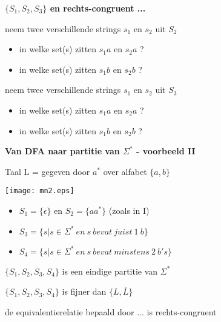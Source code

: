 \documentclass{seminar}
\newcommand{\openpagina}{}
\begin{document}
\begin{slide}
{\bf $\{S_1,S_2,S_3\}$ en rechts-congruent ...}

neem twee verschillende strings $s_1$ en $s_2$ uit $S_2$
\begin{itemize}
\item in welke set(s) zitten $s_1a$ en $s_2a$ ?
\item in welke set(s) zitten $s_1b$ en $s_2b$ ?
\end{itemize}

neem twee verschillende strings $s_1$ en $s_2$ uit $S_3$
\begin{itemize}
\item in welke set(s) zitten $s_1a$ en $s_2a$ ?
\item in welke set(s) zitten $s_1b$ en $s_2b$ ?
\end{itemize}




\end{slide} \openpagina

\begin{slide}

{\bf Van DFA naar partitie van $\Sigma^*$ - voorbeeld II}

Taal L = gegeven door $a^*$ over alfabet $\{a,b\}$




\texttt{[image: mn2.eps]}


\begin{itemize}
\item $S_1 = \{\epsilon\}$  en $S_2 = \{aa^*\}$ (zoals in I)

\item $S_3 = \{s|s \in \Sigma^*~en~s~bevat~juist~1~b\}$

\item $S_4 = \{s|s \in \Sigma^*~en~s~bevat~minstens~2~b's\}$

\end{itemize}

$\{S_1,S_2,S_3,S_4\}$ is een eindige partitie van $\Sigma^*$

$\{S_1,S_2,S_3,S_4\}$ is fijner dan $\{L, \overline{L}\}$

de equivalentierelatie bepaald door ... is rechts-congruent

\end{slide} \openpagina
\end{document}
